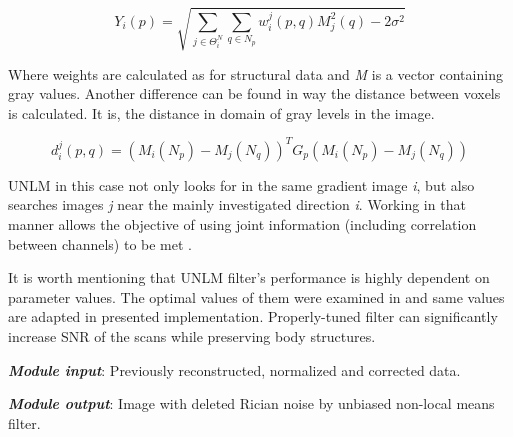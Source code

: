 \begin{equation}
Y_{i}(p)=\sqrt{\sum_{j\in\Theta_{i}^{N}}^ {}\sum_{q\in N_{p}}^ {}w_{i}^{j}(p,q)M_{j}^{2}(q)-2\sigma^{2}}
\end{equation}

Where weights are calculated as for structural data and \textit{M}
is a vector containing gray values. Another difference can be found
in way the distance between voxels is calculated. It is, the distance
in domain of gray levels in the image.

\begin{equation}
d_{i}^{j}(p,q)=(M_{i}(N_{p})-M_{j}(N_{q}))^{T}G_{p}(M_{i}(N_{p})-M_{j}(N_{q}))\label{m5e7}
\end{equation}

UNLM in this case not only looks for in the same gradient image \textit{i},
but also searches images \textit{j} near the mainly investigated direction
\textit{i}. Working in that manner allows the objective of using joint
information (including correlation between channels) to be met \cite{5a2}.

It is worth mentioning that UNLM filter's performance is highly dependent
on parameter values. The optimal values of them were examined in \cite{5a1}
and same values are adapted in presented implementation. Properly-tuned
filter can significantly increase SNR of the scans while preserving
body structures.

\textbf{\emph{Module input}}: Previously reconstructed, normalized
and corrected data.

\textbf{\emph{Module output}}: Image with deleted Rician noise by
unbiased non-local means filter. \\